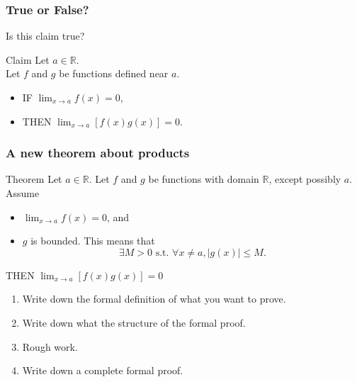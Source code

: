 \documentclass[14pt]{beamer}
\newcommand {\DS} [1] {${\displaystyle #1}$}
\newcommand {\R}{\mathbb{R}}
\newcommand{\p}{\pause}
\newcommand{\setsize}[1]{\fontsize{#1}{#1}\selectfont} %
\newcommand{\smallerfont}{\setsize{13}} %
\begin{document}
\begin{frame}[t]
\frametitle{True or False?}


Is this claim true?

\bigskip

\begin{block}{Claim}
Let $a \in \R$. \\
Let $f$ and $g$ be functions defined near $a$. \\
\begin{itemize}
	\item IF \DS{\lim_{x \to a} f(x) = 0},
	\item  THEN \DS{\lim_{x \to a} \left[ f(x) g(x) \right] = 0}.
\end{itemize}
\end{block}

\vfill

\end{frame}
\begin{frame}[t]
\frametitle{A new theorem about products}
\smallerfont
\begin{block}{Theorem}
Let $a \in \R$.  Let $f$ and $g$ be functions with domain $\R$, except possibly $a$. 
 Assume
	\begin{itemize}
		\item  \DS{\lim_{x \to a} f(x) = 0}, and
		\item $g$ is bounded. 
			This means that 
			$$\exists M >0 \mbox{ s.t. } \forall x \neq a, |g(x)| \leq M.$$
	\end{itemize}
THEN  \DS{\lim_{x \to a} \left[ f(x) g(x) \right] = 0}
\end{block}

 \vfill 
\begin{enumerate}
\p	\item  Write down the formal definition of what you want to prove.
\p	\item  Write down what the structure of the formal proof.
\p 	\item  Rough work.
\p	\item  Write down a complete formal proof.
\end{enumerate}
\vfill

\end{frame}
\end{document}
